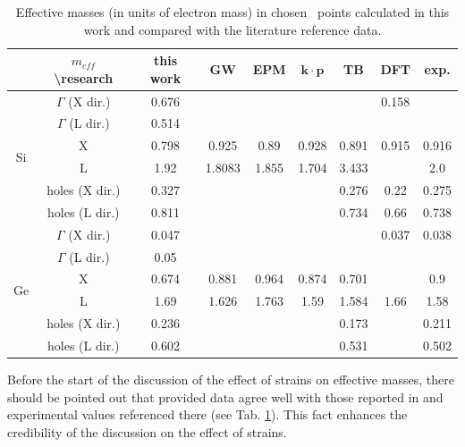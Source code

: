 \begin{table}[!htbp]
 \caption{Effective masses (in units of electron mass) in chosen \BZ\ points calculated in this work and compared with the literature reference data.}
 \centering
\begin{tabular}{|c|c|c|c|c|c|c|c|c|}
\hline
                    & $m_{eff}$ \textbackslash research & this work & GW \cite{mass-kp}     & EPM \cite{mass-kp}  & $\mathbf{k}\cdot \mathbf{p}$ \cite{mass-kp} & TB \cite{mass-tb}  & DFT \cite{mass-dft}  & exp.  \cite{mass-dft, mass-tb, mass-kp} \\ \hline
\multirow{6}{*}{Si} & $\Gamma$ (X dir.)         & 0.676    &        &       &              &       & 0.158 &       \\ \cline{2-9} 
                    & $\Gamma$ (L dir.)         & 0.514    &        &       &              &       &       &       \\ \cline{2-9} 
                    & X                         & 0.798    & 0.925  & 0.89  & 0.928        & 0.891 & 0.915 & 0.916 \\ \cline{2-9} 
                    & L                         & 1.92    & 1.8083 & 1.855 & 1.704        & 3.433 &       & 2.0     \\ \cline{2-9} 
                    & holes (X dir.)            & 0.327    &        &       &              & 0.276 & 0.22  & 0.275 \\ \cline{2-9} 
                    & holes (L dir.)            & 0.811    &        &       &              & 0.734 & 0.66  & 0.738 \\ \hline
\multirow{6}{*}{Ge} & $\Gamma$ (X dir.)         & 0.047    &        &       &              &       & 0.037 & 0.038 \\ \cline{2-9} 
                    & $\Gamma$ (L dir.)         & 0.05    &        &       &              &       &       &       \\ \cline{2-9} 
                    & X                         & 0.674    & 0.881  & 0.964 & 0.874        & 0.701 &       & 0.9   \\ \cline{2-9} 
                    & L                         & 1.69    & 1.626  & 1.763 & 1.59         & 1.584 & 1.66  & 1.58  \\ \cline{2-9} 
                    & holes (X dir.)            & 0.236    &        &       &              & 0.173 &   & 0.211 \\ \cline{2-9} 
                    & holes (L dir.)            & 0.602     &        &       &              & 0.531 &   & 0.502 \\ \hline
\end{tabular}
 \label{Tab:strain_masses}
\end{table}
Before the start of the discussion of the effect of strains on effective masses, there should be pointed out that provided data agree well with those reported in \cite{mass-dft, mass-tb, mass-kp} and experimental values referenced there (see Tab. \ref{Tab:strain_masses}).
This fact enhances the credibility of the discussion on the effect of strains.

